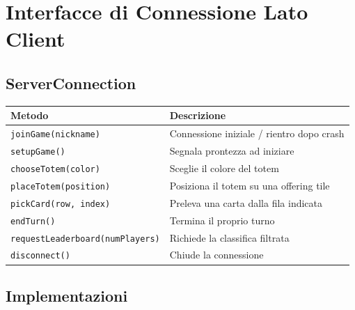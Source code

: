 \documentclass[a4paper,12pt]{article}
\newcommand{\code}[1]{\texttt{#1}}
\begin{document}
\section{Interfacce di Connessione Lato Client}

\subsection{ServerConnection}

\begin{small}
\begin{tabularx}{\textwidth}{@{}p{5.5cm}X@{}}
\toprule
\textbf{Metodo} & \textbf{Descrizione} \\
\midrule
\code{joinGame(nickname)}            & Connessione iniziale / rientro dopo crash \\
\code{setupGame()}                   & Segnala prontezza ad iniziare \\
\code{chooseTotem(color)}            & Sceglie il colore del totem \\
\code{placeTotem(position)}          & Posiziona il totem su una offering tile \\
\code{pickCard(row, index)}          & Preleva una carta dalla fila indicata \\
\code{endTurn()}                     & Termina il proprio turno \\
\code{requestLeaderboard(numPlayers)} & Richiede la classifica filtrata \\
\code{disconnect()}                  & Chiude la connessione \\
\bottomrule
\end{tabularx}
\end{small}

\subsection{Implementazioni}
\end{document}
